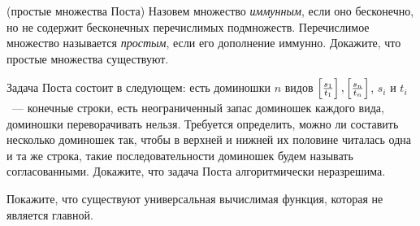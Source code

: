 \begin{ptask}{18} (простые множества Поста)
    Назовем множество {\it иммунным}, если оно бесконечно, но не содержит бесконечных перечислимых подмножеств. Перечислимое
    множество называется {\it простым}, если его дополнение иммунно. Докажите, что простые множества существуют.
\end{ptask}

\begin{ptask}{21}
	Задача Поста состоит в следующем: есть доминошки $n$ видов $\left[\frac{s_1}{t_1}\right], \left[\frac{s_n}{t_n}\right]$, $s_i$ и $t_i$~--- конечные
    строки, есть неограниченный запас доминошек каждого вида, доминошки переворачивать нельзя. Требуется определить, можно ли
    составить несколько доминошек так, чтобы в верхней и нижней их половине читалась одна и та же строка, такие последовательности
    доминошек будем называть согласованными. Докажите, что задача Поста алгоритмически неразрешима.
\end{ptask}

\begin{ptask}{26}
   Покажите, что существуют универсальная вычислимая функция, которая не является главной.
\end{ptask}

